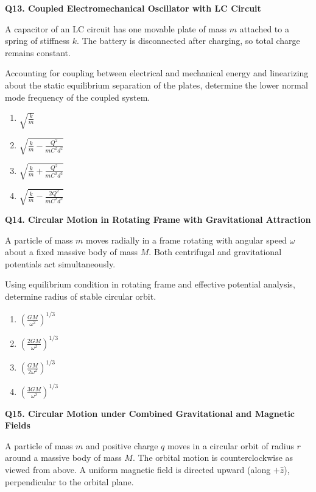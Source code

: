 \documentclass[12pt]{article}
\begin{document}

\textbf{Q13. Coupled Electromechanical Oscillator with LC Circuit}

A capacitor of an LC circuit has one movable plate of mass $m$ attached to a spring of stiffness $k$. The battery is disconnected after charging, so total charge remains constant.  

Accounting for coupling between electrical and mechanical energy and linearizing about the static equilibrium separation of the plates, determine the lower normal mode frequency of the coupled system.

\begin{enumerate}
\item[(A)] $\sqrt{\frac{k}{m}}$
\item[(B)] $\sqrt{\frac{k}{m}-\frac{Q^2}{mC^2d^2}}$
\item[(C)] $\sqrt{\frac{k}{m}+\frac{Q^2}{mC^2d^2}}$
\item[(D)] $\sqrt{\frac{k}{m}-\frac{2Q^2}{mC^2d^2}}$
\end{enumerate}


\textbf{Q14. Circular Motion in Rotating Frame with Gravitational Attraction}

A particle of mass $m$ moves radially in a frame rotating with angular speed $\omega$ about a fixed massive body of mass $M$. Both centrifugal and gravitational potentials act simultaneously.  

Using equilibrium condition in rotating frame and effective potential analysis, determine radius of stable circular orbit.

\begin{enumerate}
\item[(A)] $\left(\frac{GM}{\omega^2}\right)^{1/3}$
\item[(B)] $\left(\frac{2GM}{\omega^2}\right)^{1/3}$
\item[(C)] $\left(\frac{GM}{2\omega^2}\right)^{1/3}$
\item[(D)] $\left(\frac{3GM}{\omega^2}\right)^{1/3}$
\end{enumerate}



\textbf{Q15. Circular Motion under Combined Gravitational and Magnetic Fields}

A particle of mass $m$ and positive charge $q$ moves in a circular orbit of radius $r$ around a massive body of mass $M$. The orbital motion is counterclockwise as viewed from above. A uniform magnetic field is directed upward (along $+\hat z$), perpendicular to the orbital plane.
\end{document}
